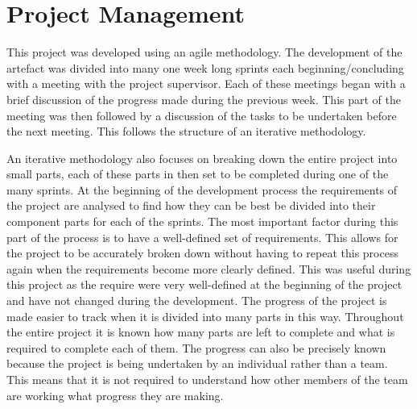 \documentclass[11pt,a4paper]{report}
\begin{document}
\section{Project Management}
This project was developed using an agile methodology. The development of the artefact was divided into many one week long sprints each beginning/concluding with a meeting with the project supervisor. Each of these meetings began with a brief discussion of the progress made during the previous week. This part of the meeting was then followed by a discussion of the tasks to be undertaken before the next meeting. This follows the structure of an iterative methodology.

An iterative methodology also focuses on breaking down the entire project into small parts, each of these parts in then set to be completed during one of the many sprints. At the beginning of the development process the requirements of the project are analysed to find how they can be best be divided into their component parts for each of the sprints. The most important factor during this part of the process is to have a well-defined set of requirements. This allows for the project to be accurately broken down without having to repeat this process again when the requirements become more clearly defined. This was useful during this project as the require were very well-defined at the beginning of the project and have not changed during the development. The progress of the project is made easier to track when it is divided into many parts in this way. Throughout the entire project it is known how many parts are left to complete and what is required to complete each of them. The progress can also be precisely known because the project is being undertaken by an individual rather than a team. This means that it is not required to understand how other members of the team are working what progress they are making.
\end{document}
